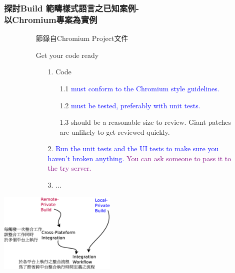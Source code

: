 \documentclass[utf8x]{beamer}
\begin{document}
\begin{frame}%
\frametitle{探討Build 範疇樣式語言之已知案例-\\\hspace{4pt}以Chromium專案為實例}
\begin{figure}
\begin{itemize}
\setlength{\itemindent}{1em}
\fontsize{8pt}{8pt}\selectfont
\item[] 節錄自Chromium Project文件
\item[] Get your code ready
\begin{itemize}
\fontsize{8pt}{8pt}\selectfont
\setlength{\itemindent}{1em}
\item[1.]  Code
\begin{itemize}
\fontsize{8pt}{8pt}\selectfont
\item[1.1] \textcolor{blue}{must conform to the Chromium style guidelines.}
\item[1.2] \textcolor{blue}{must be tested, preferably with unit tests.}
\item[1.3] should be a reasonable size to review. Giant patches are unlikely to get reviewed quickly.
\end{itemize}
\item[2.] \textcolor{blue}{Run the unit tests and the UI tests to make sure you haven't broken anything.} \textcolor{purple}{You can ask someone to pass it to the try server.}
\item[3.] ...
\end{itemize}
\end{itemize}
\end{figure}
\begin{center}
\includegraphics[width=5.6cm]{build-catgory-pattern-language-network-presentation.eps}
\end{center}
\end{frame}
\end{document}
